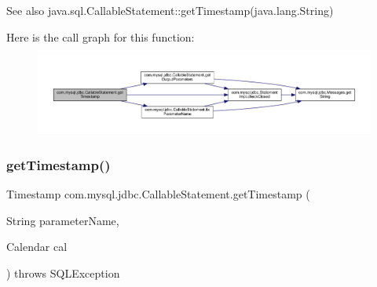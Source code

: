 \begin{DoxySeeAlso}{See also}
java.\+sql.\+Callable\+Statement\+::get\+Timestamp(java.\+lang.\+String) 
\end{DoxySeeAlso}
Here is the call graph for this function\+:\nopagebreak
\begin{figure}[H]
\begin{center}
\leavevmode
\includegraphics[width=350pt]{classcom_1_1mysql_1_1jdbc_1_1_callable_statement_ac7c3faa6bd8c91104870d6ae4dc25916_cgraph}
\end{center}
\end{figure}
\mbox{\label{classcom_1_1mysql_1_1jdbc_1_1_callable_statement_a85044e257c65d9ce314d9cdbee27a853}} 
\subsubsection{\texorpdfstring{get\+Timestamp()}{getTimestamp()}\hspace{0.1cm}{\footnotesize\ttfamily [4/4]}}
{\footnotesize\ttfamily Timestamp com.\+mysql.\+jdbc.\+Callable\+Statement.\+get\+Timestamp (\begin{DoxyParamCaption}\item[{String}]{parameter\+Name,  }\item[{Calendar}]{cal }\end{DoxyParamCaption}) throws S\+Q\+L\+Exception}

